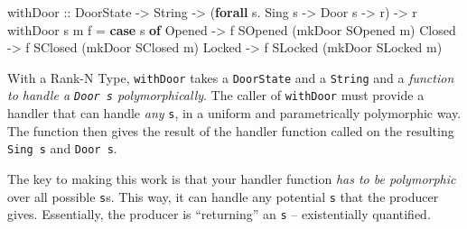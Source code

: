 \documentclass[]{article}
\newenvironment{Shaded}{}{}
\newcommand{\DataTypeTok}[1]{\textcolor[rgb]{0.56,0.13,0.00}{#1}}
\newcommand{\KeywordTok}[1]{\textcolor[rgb]{0.00,0.44,0.13}{\textbf{#1}}}
\newcommand{\NormalTok}[1]{#1}
\newcommand{\OperatorTok}[1]{\textcolor[rgb]{0.40,0.40,0.40}{#1}}
\newcommand{\OtherTok}[1]{\textcolor[rgb]{0.00,0.44,0.13}{#1}}
\newcommand{\StringTok}[1]{\textcolor[rgb]{0.25,0.44,0.63}{#1}}
\begin{document}
\begin{Shaded}
\begin{Highlighting}[]
\NormalTok{withDoor}
\OtherTok{    ::} \DataTypeTok{DoorState}
    \OtherTok{{-}\textgreater{}} \DataTypeTok{String}
    \OtherTok{{-}\textgreater{}}\NormalTok{ (}\KeywordTok{forall}\NormalTok{ s}\OperatorTok{.} \DataTypeTok{Sing}\NormalTok{ s }\OtherTok{{-}\textgreater{}} \DataTypeTok{Door}\NormalTok{ s }\OtherTok{{-}\textgreater{}}\NormalTok{ r)}
    \OtherTok{{-}\textgreater{}}\NormalTok{ r}
\NormalTok{withDoor s m f }\OtherTok{=} \KeywordTok{case}\NormalTok{ s }\KeywordTok{of}
    \DataTypeTok{Opened} \OtherTok{{-}\textgreater{}}\NormalTok{ f }\DataTypeTok{SOpened}\NormalTok{ (mkDoor }\DataTypeTok{SOpened}\NormalTok{ m)}
    \DataTypeTok{Closed} \OtherTok{{-}\textgreater{}}\NormalTok{ f }\DataTypeTok{SClosed}\NormalTok{ (mkDoor }\DataTypeTok{SClosed}\NormalTok{ m)}
    \DataTypeTok{Locked} \OtherTok{{-}\textgreater{}}\NormalTok{ f }\DataTypeTok{SLocked}\NormalTok{ (mkDoor }\DataTypeTok{SLocked}\NormalTok{ m)}
\end{Highlighting}
\end{Shaded}

With a Rank-N Type, \texttt{withDoor} takes a \texttt{DoorState} and a
\texttt{String} and a \emph{function to handle a \texttt{Door\ s}
polymorphically}. The caller of \texttt{withDoor} must provide a handler that
can handle \emph{any} \texttt{s}, in a uniform and parametrically polymorphic
way. The function then gives the result of the handler function called on the
resulting \texttt{Sing\ s} and \texttt{Door\ s}.

\begin{Shaded}
\end{Shaded}

The key to making this work is that your handler function \emph{has to be
polymorphic} over all possible \texttt{s}s. This way, it can handle any
potential \texttt{s} that the producer gives. Essentially, the producer is
``returning'' an \texttt{s} -- existentially quantified.
\end{document}
